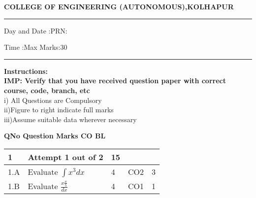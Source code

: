 \documentclass[12pt]{article}
\begin{document}
	\par
	{\bf{COLLEGE OF ENGINEERING (AUTONOMOUS),KOLHAPUR}}
	\par\noindent\rule{\textwidth}{0.4pt}
	
	\par
	\par
	\par
\begin{flushleft}
	Day and Date :{}\hspace{5.5cm}PRN:
\end{flushleft}

\begin{flushleft}
	Time :{}\hspace{7cm}Max Marks:{30}\\
\end{flushleft}
\noindent\rule{\textwidth}{0.1pt}
\begin{flushleft}
	{\bf Instructions:}\\
	{\hspace{0.5cm} \bf IMP: Verify that you have received question paper with correct course, code, branch, etc}\\
	\hspace{1cm}i) All Questions are Compulsory\\
	\hspace{1cm}ii)Figure to right indicate full marks\\
	\hspace{1cm}iii)Assume suitable data wherever necessary\\
\end{flushleft} 

	\begin{flushleft}
	\bf{QNo}\hspace{1.2cm} \bf{Question} \hspace{5.5cm}  \bf{Marks} \hspace{0.2cm} \bf{CO} \hspace{0.2cm}	\bf{BL}	
	
	
	
	
	
	
\end{flushleft}

		

	
	
	\begin{longtable}{|L{1cm}|L{8cm}|C{1cm}|C{1cm}|C{1cm}|}\hline
			\bf1 & \bf{Attempt} \bf1 out of \bf2 & \bf15 & & \\ \hline
				1.A &
	Evaluate $\int x^{3}dx$ \newline
		 &  4 & CO2 & 3\\ \hline
		1.B &
	Evaluate $\frac{x\frac{x}{5}}{dx}$ \newline
		 &  4 & CO1 & 1\\ \hline
		\end{longtable}
\end{document}
